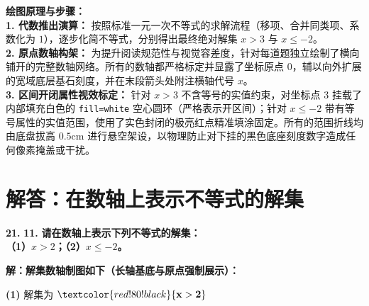 \vspace{0.4cm}
{\small\color{blue!70!black}
\textbf{绘图原理与步骤：}\\
\textbf{1. 代数推出演算：} 按照标准一元一次不等式的求解流程（移项、合并同类项、系数化为 $1$），逐步化简不等式，分别得出最终绝对解集 $x > 3$ 与 $x \leqslant -2$。\\
\textbf{2. 原点数轴构架：} 为提升阅读规范性与视觉容差度，针对每道题独立绘制了横向铺开的完整数轴网络。所有的数轴都严格标定并显露了坐标原点 $0$，辅以向外扩展的宽域底层基石刻度，并在末段箭头处附注横轴代号 $x$。\\
\textbf{3. 区间开闭属性视效标定：} 针对 $x > 3$ 不含等号的实值约束，对坐标点 $3$ 挂载了内部填充白色的 \texttt{fill=white} 空心圆环（严格表示开区间）；针对 $x \leqslant -2$ 带有等号属性的实值范围，使用了实色封闭的极亮红点精准填涂固定。所有的范围折线均由底盘拔高 $0.5\mathrm{cm}$ 进行悬空架设，以物理防止对下挂的黑色底座刻度数字造成任何像素掩盖或干扰。
}

\newpage



\newpage

\section{解答：在数轴上表示不等式的解集}

\vspace{0.6cm}

\textbf{\LARGE 21.} \textbf{\color{cyan!80!blue} 11. }\textbf{请在数轴上表示下列不等式的解集：\\
（1）$x > 2$；\hspace{4cm}（2）$x \leqslant -2$。}

\vspace{0.4cm}
\textbf{解：解集数轴制图如下（长轴基底与原点强制展示）：}

\vspace{0.4cm}
\noindent \textbf{(1)} 解集为 $\textcolor{red!80!black}{\mathbf{x > 2}}$ \par\vspace{0.2cm}
\begin{center}
\end{center}


